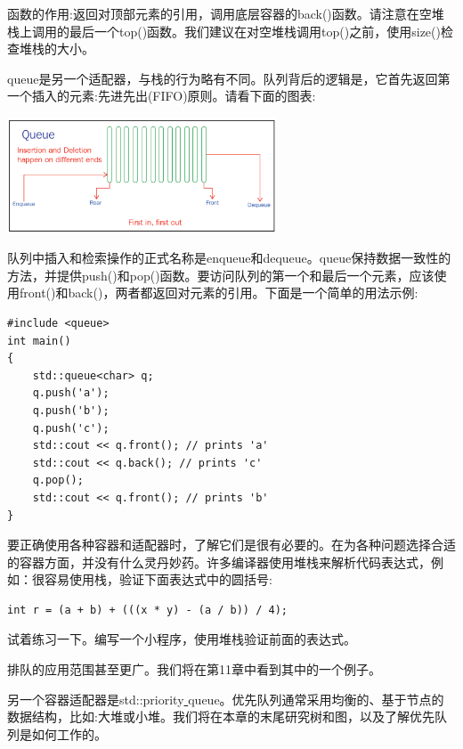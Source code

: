 函数的作用:返回对顶部元素的引用，调用底层容器的back()函数。请注意在空堆栈上调用的最后一个top()函数。我们建议在对空堆栈调用top()之前，使用size()检查堆栈的大小。 \par
queue是另一个适配器，与栈的行为略有不同。队列背后的逻辑是，它首先返回第一个插入的元素:先进先出(FIFO)原则。请看下面的图表: \par

\begin{center}
	\includegraphics[width=0.6\textwidth]{content/Section-2/Chapter-6/17}
\end{center}

队列中插入和检索操作的正式名称是enqueue和dequeue。queue保持数据一致性的方法，并提供push()和pop()函数。要访问队列的第一个和最后一个元素，应该使用front()和back()，两者都返回对元素的引用。下面是一个简单的用法示例: \par

\begin{lstlisting}[caption={}]
#include <queue>
int main()
{
	std::queue<char> q;
	q.push('a');
	q.push('b');
	q.push('c');
	std::cout << q.front(); // prints 'a'
	std::cout << q.back(); // prints 'c'
	q.pop();
	std::cout << q.front(); // prints 'b'
}
\end{lstlisting}

要正确使用各种容器和适配器时，了解它们是很有必要的。在为各种问题选择合适的容器方面，并没有什么灵丹妙药。许多编译器使用堆栈来解析代码表达式，例如：很容易使用栈，验证下面表达式中的圆括号: \par

\begin{lstlisting}[caption={}]
int r = (a + b) + (((x * y) - (a / b)) / 4);
\end{lstlisting}

试着练习一下。编写一个小程序，使用堆栈验证前面的表达式。 \par
排队的应用范围甚至更广。我们将在第11章中看到其中的一个例子。 \par
另一个容器适配器是std::priority\underline{ }queue。优先队列通常采用均衡的、基于节点的数据结构，比如:大堆或小堆。我们将在本章的末尾研究树和图，以及了解优先队列是如何工作的。 \par

